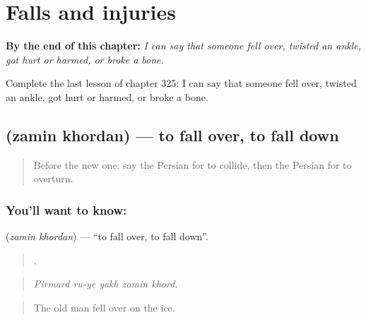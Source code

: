 
\chapter{Falls and injuries}
\label{ch:fa-falls-and-injuries}

\begin{chapteropening}
\textbf{By the end of this chapter:} \emph{I can say that someone fell over, twisted an ankle, got hurt or harmed, or broke a bone.}

Complete the last lesson of chapter 325: I can say that someone fell over, twisted an ankle, got hurt or harmed, or broke a bone.
\end{chapteropening}

\section[\texorpdfstring{\fa{زمین} \fa{خوردن} (zamin khordan)}{زمین خوردن (zamin khordan)}]{  (zamin khordan) — to fall over, to fall down}

\label{lesson:FA-C325-zamin-khordan}



\begin{quote}
Before the new one: say the Persian for to collide, then the Persian for to overturn.
\end{quote}

\subsection*{You'll want to know:  }
\textbf{ } (\emph{zamin khordan}) — \textquotedblleft{}to fall over, to fall down\textquotedblright{}.

\begin{quote}
    .
\end{quote}

\begin{quote}
\emph{Pirmard ru-ye yakh zamin khord.}
\end{quote}

\begin{quote}
The old man fell over on the ice.
\end{quote}

